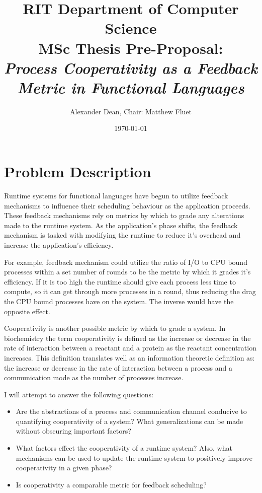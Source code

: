 \documentclass[11pt]{artikel3}
\title{RIT Department of Computer Science\\MSc Thesis Pre-Proposal:\\
	\emph{Process Cooperativity as a Feedback Metric in Functional Languages}
}
\author{Alexander Dean, Chair: Matthew Fluet}
\date{\today}
\begin{document}
\maketitle

\section{Problem Description}

Runtime systems for functional languages have begun to utilize feedback mechanisms to influence their 
scheduling behaviour as the application proceeds. These feedback mechanisms rely on metrics by which to 
grade any alterations made to the runtime system. As the application's phase shifts, the feedback mechanism
is tasked with modifying the runtime to reduce it's overhead and increase the application's efficiency.

For example, feedback mechanism could utilize the ratio of I/O to CPU bound processes within a set number 
of rounds to be the metric by which it grades it's efficiency. If it is too high the runtime should give
each process less time to compute, so it can get through more processes in a round, thus reducing the drag
the CPU bound processes have on the system. The inverse would have the opposite effect.

Cooperativity is another possible metric by which to grade a system. In biochemistry the term cooperativity 
is defined as the increase or decrease in the rate of interaction between a reactant and a protein as 
the reactant concentration increases. This definition translates well as an information theoretic definition 
as: the increase or decrease in the rate of interaction between a process and a communication mode as the 
number of processes increase.


I will attempt to answer the following questions:
\begin{itemize}[leftmargin=.5in]
	\item Are the abstractions of a process and communication channel conducive to quantifying cooperativity of a system? What generalizations can be made without obscuring important factors?
	\item What factors effect the cooperativity of a runtime system? Also, what mechanisms can be used to update the runtime system to positively improve cooperativity in a given phase?
	\item Is cooperativity a comparable metric for feedback scheduling?
\end{itemize}
\end{document}
